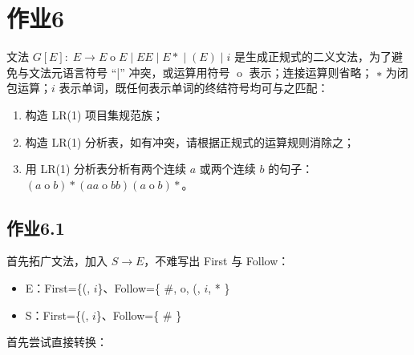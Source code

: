 
\section{作业6}

文法 $G[E]:\;E \rightarrow E \operatorname{o} E \;|\; E E \;|\; E * \;|\; (E) \;|\; i$ 是生成正规式的二义文法，为了避免与文法元语言符号 “|” 冲突，或运算用符号 $\operatorname{o}$ 表示；连接运算则省略； $∗$ 为闭包运算；$i$ 表示单词，既任何表示单词的终结符号均可与之匹配：
\begin{enumerate}
    \item 构造 LR(1) 项目集规范族；
    \item 构造 LR(1) 分析表，如有冲突，请根据正规式的运算规则消除之；
    \item 用 LR(1) 分析表分析有两个连续 $a$ 或两个连续 $b$ 的句子：$(a\operatorname{o}b)*(aa\operatorname{o}bb)(a\operatorname{o}b)*$。
\end{enumerate}

\subsection{作业6.1}

首先拓广文法，加入 $S\rightarrow E$，不难写出 First 与 Follow：

\begin{itemize}
    \item E：First=\{(, $i$\}、Follow=\{ \#, o, (, $i$, * \}
    \item S：First=\{(, $i$\}、Follow=\{ \# \}
\end{itemize}

首先尝试直接转换：

